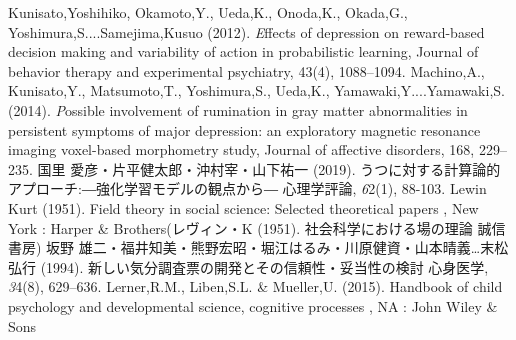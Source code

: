 Kunisato,Yoshihiko, Okamoto,Y., Ueda,K., Onoda,K., Okada,G., Yoshimura,S....Samejima,Kusuo (2012). {\emph Effects of depression on reward-based decision making and variability of action in probabilistic learning}, Journal of behavior therapy and experimental psychiatry, 43(4), 1088--1094.
Machino,A., Kunisato,Y., Matsumoto,T., Yoshimura,S., Ueda,K., Yamawaki,Y....Yamawaki,S. (2014). {\emph Possible involvement of rumination in gray matter abnormalities in persistent symptoms of major depression: an exploratory magnetic resonance imaging voxel-based morphometry study}, Journal of affective disorders, 168, 229--235.
国里 愛彦・片平健太郎・沖村宰・山下祐一 (2019). うつに対する計算論的アプローチ:―強化学習モデルの観点から― 心理学評論, {\emph 62}(1), 88-103.
Lewin Kurt (1951). Field theory in social science: Selected theoretical papers , New York : Harper \& Brothers(レヴィン・K (1951). 社会科学における場の理論 誠信書房)
坂野 雄二・福井知美・熊野宏昭・堀江はるみ・川原健資・山本晴義…末松弘行 (1994). 新しい気分調査票の開発とその信頼性・妥当性の検討 心身医学, {\emph 34}(8), 629--636.
Lerner,R.M., Liben,S.L. & Mueller,U. (2015). Handbook of child psychology and developmental science, cognitive processes , NA : John Wiley \& Sons
